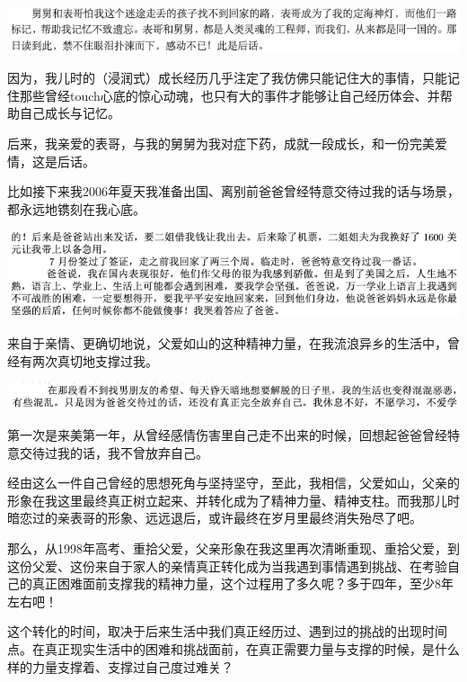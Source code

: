 \documentclass[9pt, b5paper]{article}
\begin{document}
\begin{center}
\includegraphics[width=.9\linewidth]{./pic/backups_plans_20210422_231039.png}
\end{center}

因为，我儿时的（浸润式）成长经历几乎注定了我仿佛只能记住大的事情，只能记住那些曾经touch心底的惊心动魂，也只有大的事件才能够让自己经历体会、并帮助自己成长与记忆。

后来，我亲爱的表哥，与我的舅舅为我对症下药，成就一段成长，和一份完美爱情，这是后话。

比如接下来我2006年夏天我准备出国、离别前爸爸曾经特意交待过我的话与场景，都永远地镌刻在我心底。 

\begin{center}
\includegraphics[width=.9\linewidth]{./pic/backups_plans_20210422_175337.png}
\end{center}

来自于亲情、更确切地说，父爱如山的这种精神力量，在我流浪异乡的生活中，曾经有两次真切地支撑过我。 

\begin{center}
\includegraphics[width=.9\linewidth]{./pic/backups_plans_20210422_180014.png}
\end{center}

第一次是来美第一年，从曾经感情伤害里自己走不出来的时候，回想起爸爸曾经特意交待过我的话，我不曾放弃自己。

经由这么一件自己曾经的思想死角与坚持坚守，至此，我相信，父爱如山，父亲的形象在我这里最终真正树立起来、并转化成为了精神力量、精神支柱。而我那儿时暗恋过的亲表哥的形象、远远退后，或许最终在岁月里最终消失殆尽了吧。

那么，从1998年高考、重拾父爱，父亲形象在我这里再次清晰重现、重拾父爱，到这份父爱、这份来自于家人的亲情真正转化成为当我遇到事情遇到挑战、在考验自己的真正困难面前支撑我的精神力量，这个过程用了多久呢？多于四年，至少8年左右吧！

这个转化的时间，取决于后来生活中我们真正经历过、遇到过的挑战的出现时间点。在真正现实生活中的困难和挑战面前，在真正需要力量与支撑的时候，是什么样的力量支撑着、支撑过自己度过难关？
\end{document}
